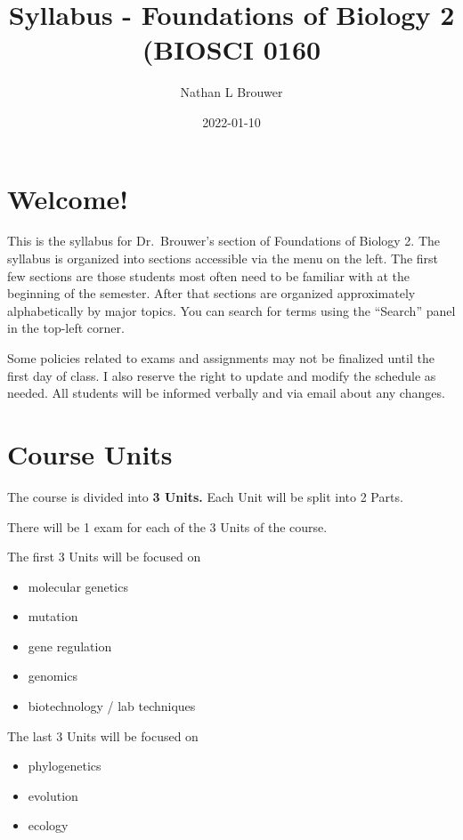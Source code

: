 \documentclass[
]{book}
\title{Syllabus - Foundations of Biology 2 (BIOSCI 0160}
\author{Nathan L Brouwer}
\date{2022-01-10}
\providecommand{\tightlist}{%
  \setlength{\itemsep}{0pt}\setlength{\parskip}{0pt}}
\begin{document}
\maketitle

{
\setcounter{tocdepth}{1}
\tableofcontents
}
\hypertarget{welcome}{%
\chapter{Welcome!}\label{welcome}}

This is the syllabus for Dr.~Brouwer's section of Foundations of Biology 2. The syllabus is organized into sections accessible via the menu on the left. The first few sections are those students most often need to be familiar with at the beginning of the semester. After that sections are organized approximately alphabetically by major topics. You can search for terms using the ``Search'' panel in the top-left corner.

Some policies related to exams and assignments may not be finalized until the first day of class. I also reserve the right to update and modify the schedule as needed. All students will be informed verbally and via email about any changes.

\hypertarget{course-units}{%
\chapter{Course Units}\label{course-units}}

The course is divided into \textbf{3 Units.} Each Unit will be split into 2 Parts.

There will be 1 exam for each of the 3 Units of the course.

The first 3 Units will be focused on

\begin{itemize}
\tightlist
\item
  molecular genetics
\item
  mutation
\item
  gene regulation
\item
  genomics
\item
  biotechnology / lab techniques
\end{itemize}

The last 3 Units will be focused on

\begin{itemize}
\tightlist
\item
  phylogenetics
\item
  evolution
\item
  ecology
\end{itemize}
\end{document}
